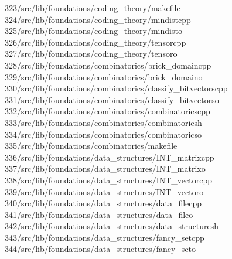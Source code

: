 \begin{tabbing}
323\>/src/lib/foundations/coding\_theory/makefile\\[0pt]
324\>/src/lib/foundations/coding\_theory/mindistcpp\\[0pt]
325\>/src/lib/foundations/coding\_theory/mindisto\\[0pt]
326\>/src/lib/foundations/coding\_theory/tensorcpp\\[0pt]
327\>/src/lib/foundations/coding\_theory/tensoro\\[0pt]
328\>/src/lib/foundations/combinatorics/brick\_domaincpp\\[0pt]
329\>/src/lib/foundations/combinatorics/brick\_domaino\\[0pt]
330\>/src/lib/foundations/combinatorics/classify\_bitvectorscpp\\[0pt]
331\>/src/lib/foundations/combinatorics/classify\_bitvectorso\\[0pt]
332\>/src/lib/foundations/combinatorics/combinatoricscpp\\[0pt]
333\>/src/lib/foundations/combinatorics/combinatoricsh\\[0pt]
334\>/src/lib/foundations/combinatorics/combinatoricso\\[0pt]
335\>/src/lib/foundations/combinatorics/makefile\\[0pt]
336\>/src/lib/foundations/data\_structures/INT\_matrixcpp\\[0pt]
337\>/src/lib/foundations/data\_structures/INT\_matrixo\\[0pt]
338\>/src/lib/foundations/data\_structures/INT\_vectorcpp\\[0pt]
339\>/src/lib/foundations/data\_structures/INT\_vectoro\\[0pt]
340\>/src/lib/foundations/data\_structures/data\_filecpp\\[0pt]
341\>/src/lib/foundations/data\_structures/data\_fileo\\[0pt]
342\>/src/lib/foundations/data\_structures/data\_structuresh\\[0pt]
343\>/src/lib/foundations/data\_structures/fancy\_setcpp\\[0pt]
344\>/src/lib/foundations/data\_structures/fancy\_seto\\[0pt]

\end{tabbing}
